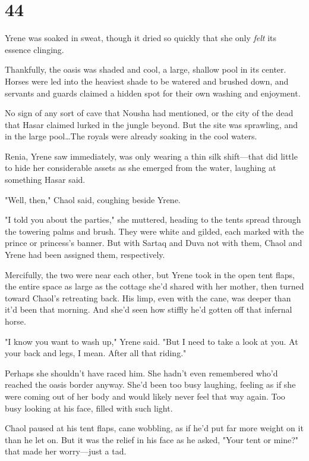 
\chapter{44}

Yrene was soaked in sweat, though it dried so quickly that she only \emph{felt} its essence clinging.

Thankfully, the oasis was shaded and cool, a large, shallow pool in its center.
Horses were led into the heaviest shade to be watered and brushed down, and servants and guards claimed a hidden spot for their own washing and enjoyment.

No sign of any sort of cave that Nousha had mentioned, or the city of the dead that Hasar claimed lurked in the jungle beyond.
But the site was sprawling, and in the large pool\ldots The royals were already soaking in the cool waters.

Renia, Yrene saw immediately, was only wearing a thin silk shift---that did little to hide her considerable assets as she emerged from the water, laughing at something Hasar said.

"Well, then," Chaol said, coughing beside Yrene.

"I told you about the parties," she muttered, heading to the tents spread through the towering palms and brush.
They were white and gilded, each marked with the prince or princess's banner.
But with Sartaq and Duva not with them, Chaol and Yrene had been assigned them, respectively.

Mercifully, the two were near each other, but Yrene took in the open tent flaps, the entire space as large as the cottage she'd shared with her mother, then turned toward Chaol's retreating back.
His limp, even with the cane, was deeper than it'd been that morning.
And she'd seen how stiffly he'd gotten off that infernal horse.

"I know you want to wash up," Yrene said.
"But I need to take a look at you.
At your back and legs, I mean.
After all that riding."

Perhaps she shouldn't have raced him.
She hadn't even remembered who'd reached the oasis border anyway.
She'd been too busy laughing, feeling as if she were coming out of her body and would likely never feel that way again.
Too busy looking at his face, filled with such light.

Chaol paused at his tent flaps, cane wobbling, as if he'd put far more weight on it than he let on.
But it was the relief in his face as he asked, "Your tent or mine?"
that made her worry---just a tad.

